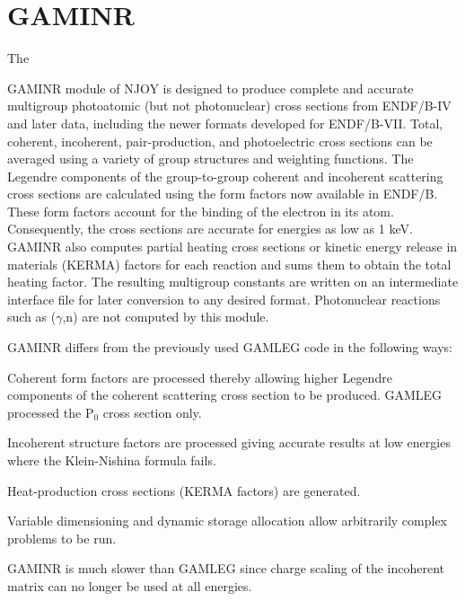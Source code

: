 \section{GAMINR}
\label{sGAMINR}

\hypertarget{sGAMINRhy}{The}
GAMINR module of NJOY is designed to
produce complete and accurate multigroup photoatomic
 (but not photonuclear) cross sections
from ENDF/B-IV and later data\cite{HUGO}, including
the newer formats developed for ENDF/B-VII.  Total, coherent,
incoherent, pair-production, and photoelectric cross sections can be
averaged using a variety of group structures
and weighting functions.  The Legendre
components of the group-to-group coherent and incoherent scattering
cross sections are calculated using the form factors\cite{Hubbell}
 now available in ENDF/B.  These form
factors account for the binding of the electron in its atom.
Consequently, the cross sections are accurate for energies as
low as 1 keV.  GAMINR also computes partial heating cross sections
or kinetic energy release in materials (KERMA) factors
for each reaction and sums them to obtain the total heating factor.
The resulting multigroup constants are written on an intermediate
interface file for later conversion to any desired format.
Photonuclear reactions such as
($\gamma$,n) are not computed by this module.

GAMINR differs from the previously used GAMLEG code\cite{GAMLEG} in
the following ways:
\begin{itemize}
\begin{singlespace}
\item Coherent form factors are processed thereby allowing higher
      Legendre components of the coherent scattering cross section to
      be produced.  GAMLEG processed the P$_0$ cross section only.

\item Incoherent structure factors are processed giving
      accurate results at low energies where the Klein-Nishina formula
      fails.

\item Heat-production cross sections (KERMA factors) are
      generated.

\item Variable dimensioning and dynamic storage allocation
      allow arbitrarily complex problems to be run.

\item GAMINR is much slower than GAMLEG since charge scaling
      of the incoherent matrix can no longer be used at all energies.
\end{singlespace}
\end{itemize}

